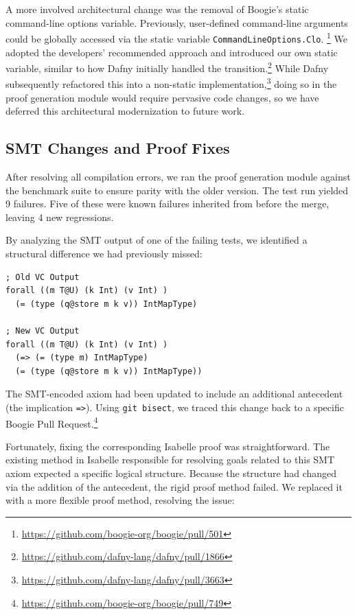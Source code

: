A more involved architectural change was the removal of Boogie's static command-line options variable.
Previously, user-defined command-line arguments could be globally accessed via the static variable \lstinline[columns=fixed]{CommandLineOptions.Clo}.
\footnote{\url{https://github.com/boogie-org/boogie/pull/501}}
We adopted the developers' recommended approach and introduced our own static variable, similar to how Dafny initially handled the transition.\footnote{\url{https://github.com/dafny-lang/dafny/pull/1866}}
While Dafny subsequently refactored this into a non-static implementation,\footnote{\url{https://github.com/dafny-lang/dafny/pull/3663}}
doing so in the proof generation module would require pervasive code changes,
so we have deferred this architectural modernization to future work.

\subsection{SMT Changes and Proof Fixes}
\label{sec:smt-change}

After resolving all compilation errors, we ran the proof generation module against the benchmark suite to ensure parity with the older version.
The test run yielded 9 failures. Five of these were known failures inherited from before the merge, leaving 4 new regressions.

By analyzing the SMT output of one of the failing tests, we identified a structural difference we had previously missed:

\begin{lstlisting}[language=SMT, numbers=none,
caption={SMT type axiom excerpt}]
; Old VC Output
forall ((m T@U) (k Int) (v Int) ) 
  (= (type (q@store m k v)) IntMapType)

; New VC Output
forall ((m T@U) (k Int) (v Int) ) 
  (=> (= (type m) IntMapType)
  (= (type (q@store m k v)) IntMapType))
\end{lstlisting}

The SMT-encoded axiom had been updated to include an additional antecedent (the implication \lstinline[columns=fixed, language=SMT]{=>}).
Using \texttt{git bisect}, we traced this change back to a specific Boogie Pull Request.\footnote{\url{https://github.com/boogie-org/boogie/pull/749}}

Fortunately, fixing the corresponding Isabelle proof was straightforward.
The existing method in Isabelle responsible for resolving goals related to this SMT axiom expected a specific logical structure.
Because the structure had changed via the addition of the antecedent, the rigid proof method failed.
We replaced it with a more flexible proof method, resolving the issue:

